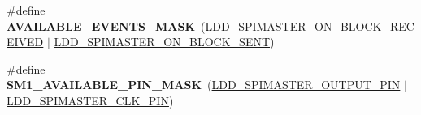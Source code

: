 \begin{DoxyCompactItemize}
\item 
\hypertarget{group___s_m1__module_ga5f04a8830cd52a3ffa1678d113f31aee}{\#define {\bfseries A\-V\-A\-I\-L\-A\-B\-L\-E\-\_\-\-E\-V\-E\-N\-T\-S\-\_\-\-M\-A\-S\-K}~(\hyperlink{group___p_e___types__module_ga86acbb58883ee4b3c59516dd9e512cd6}{L\-D\-D\-\_\-\-S\-P\-I\-M\-A\-S\-T\-E\-R\-\_\-\-O\-N\-\_\-\-B\-L\-O\-C\-K\-\_\-\-R\-E\-C\-E\-I\-V\-E\-D} $|$ \hyperlink{group___p_e___types__module_ga49607a93aeafc9c6cc3210aa00df6f2d}{L\-D\-D\-\_\-\-S\-P\-I\-M\-A\-S\-T\-E\-R\-\_\-\-O\-N\-\_\-\-B\-L\-O\-C\-K\-\_\-\-S\-E\-N\-T})}\label{group___s_m1__module_ga5f04a8830cd52a3ffa1678d113f31aee}

\item 
\hypertarget{group___s_m1__module_gab388ba6d75937b5119086cb756d45ead}{\#define {\bfseries S\-M1\-\_\-\-A\-V\-A\-I\-L\-A\-B\-L\-E\-\_\-\-P\-I\-N\-\_\-\-M\-A\-S\-K}~(\hyperlink{group___p_e___types__module_ga31823c100ddaf6729e0a16f7cea77e7a}{L\-D\-D\-\_\-\-S\-P\-I\-M\-A\-S\-T\-E\-R\-\_\-\-O\-U\-T\-P\-U\-T\-\_\-\-P\-I\-N} $|$ \hyperlink{group___p_e___types__module_gad1273260faec4033c18eb56120e8fc7e}{L\-D\-D\-\_\-\-S\-P\-I\-M\-A\-S\-T\-E\-R\-\_\-\-C\-L\-K\-\_\-\-P\-I\-N})}\label{group___s_m1__module_gab388ba6d75937b5119086cb756d45ead}


\end{DoxyCompactItemize}
